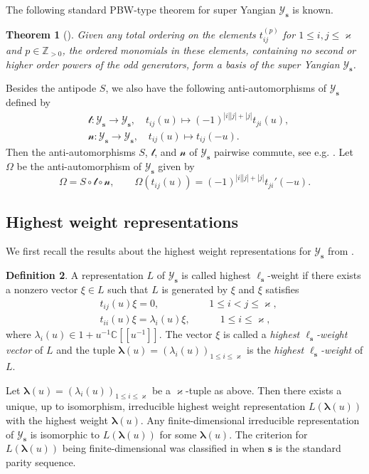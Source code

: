 \documentclass[11pt,reqno]{amsart}
\numberwithin{equation}{section}
\newtheorem{thm}{Theorem}[section]
\theoremstyle{definition}
\newtheorem{dfn}[thm]{Definition}
\theoremstyle{remark}
\newcommand{\beq}{\begin{equation}}
\newcommand{\eeq}{\end{equation}}
\newcommand{\C}{\mathbb{C}}
\newcommand{\mc}{\mathcal}
\newcommand{\lle}{\leqslant}
\newcommand{\la}{\lambda}
\newcommand{\bla}{\bm\lambda}
\newcommand{\YMN}{{\mathscr{Y}_{\bm s}}}
\newcommand{\ka}{\varkappa}
\newcommand{\s}{{\bm s}}
\begin{document}
The following standard PBW-type theorem for super Yangian $\YMN$ is known.
\begin{thm}[{\cite{Gow2007gauss,Peng2016parabolic}}]\label{thm:PBW}
Given any total ordering on the elements $t_{ij}^{(p)}$ for $1\lle i,j\lle \ka$ and $p\in\mathbb Z_{>0}$, the ordered monomials in these elements, containing no second or higher
order powers of the odd generators, form a basis of the super Yangian $\YMN$.
\end{thm}

Besides the antipode $S$, we also have the following anti-automorphisms of $\YMN$ defined by
\begin{align*}
&\mc t:\YMN\to\YMN,\quad t_{ij}(u)\mapsto (-1)^{|i||j|+|j|}t_{ji}(u),\\%
&\mc n:\YMN\to\YMN,\quad t_{ij}(u)\mapsto t_{ij}(-u).%
\end{align*}
Then the anti-automorphisms $S$, $\mc t$, and $\mc n$ of $\YMN$ pairwise commute, see e.g. \cite[Proposition 1.5]{Nazarov2020yangian}. Let $\Omega$ be the anti-automorphism of $\YMN$ given by
\beq\label{Omega}
\Omega=S\circ \mc t\circ \mc n,\qquad \Omega(t_{ij}(u))=(-1)^{|i||j|+|j|}t_{ji}'(-u).
\eeq
\subsection{Highest weight representations}
We first recall the results about the highest weight representations for $\YMN$ from \cite{Zhang1996super}.
\begin{dfn}
A representation $L$ of $\YMN$ is called highest $\ell_\s$-weight if there exists a nonzero vector $\xi\in L$ such that $L$ is generated by $\xi$ and $\xi$ satisfies
\beq\label{eq:highest-Y}
\begin{split}
   & t_{ij}(u)\xi=0,  \qquad \quad\quad \quad 1\lle i<j\lle \ka,\\
   &    t_{ii}(u)\xi=\la_i(u)\xi,\qquad\quad  1\lle i\lle \ka,
\end{split}
\eeq
where $\la_i(u)\in 1+u^{-1}\C[[u^{-1}]]$. The vector $\xi$ is called a {\it highest $\ell_\s$-weight vector} of $L$ and the tuple $\bla(u)=(\la_i(u))_{1\lle i\lle \ka}$ is the {\it highest $\ell_\s$-weight} of $L$.
\end{dfn}

Let $\bla(u)=(\la_i(u))_{1\lle i\lle \ka}$ be a $\ka$-tuple as above. Then there exists a unique, up to isomorphism, irreducible highest weight representation $L(\bla(u))$ with the highest weight $\bla(u)$. Any finite-dimensional irreducible representation of $\YMN$ is isomorphic to $L(\bla(u))$ for some $\bla(u)$. The criterion for $L(\bla(u))$ being finite-dimensional was classified in \cite{Zhang1996super} when $\s$ is the standard parity sequence.
\end{document}
